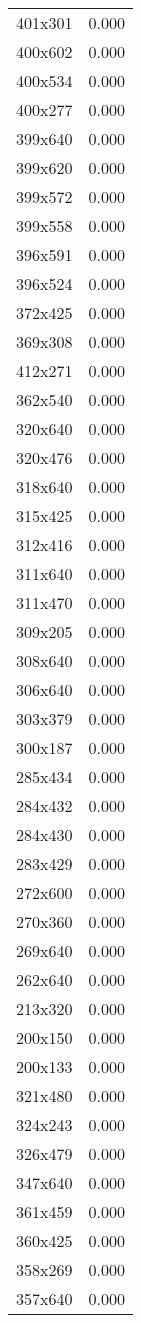 \begin{table}
\begin{tabular}{lr}
401x301 & 0.000 \\
400x602 & 0.000 \\
400x534 & 0.000 \\
400x277 & 0.000 \\
399x640 & 0.000 \\
399x620 & 0.000 \\
399x572 & 0.000 \\
399x558 & 0.000 \\
396x591 & 0.000 \\
396x524 & 0.000 \\
372x425 & 0.000 \\
369x308 & 0.000 \\
412x271 & 0.000 \\
362x540 & 0.000 \\
320x640 & 0.000 \\
320x476 & 0.000 \\
318x640 & 0.000 \\
315x425 & 0.000 \\
312x416 & 0.000 \\
311x640 & 0.000 \\
311x470 & 0.000 \\
309x205 & 0.000 \\
308x640 & 0.000 \\
306x640 & 0.000 \\
303x379 & 0.000 \\
300x187 & 0.000 \\
285x434 & 0.000 \\
284x432 & 0.000 \\
284x430 & 0.000 \\
283x429 & 0.000 \\
272x600 & 0.000 \\
270x360 & 0.000 \\
269x640 & 0.000 \\
262x640 & 0.000 \\
213x320 & 0.000 \\
200x150 & 0.000 \\
200x133 & 0.000 \\
321x480 & 0.000 \\
324x243 & 0.000 \\
326x479 & 0.000 \\
347x640 & 0.000 \\
361x459 & 0.000 \\
360x425 & 0.000 \\
358x269 & 0.000 \\
357x640 & 0.000 \\

\end{tabular}
\end{table}
